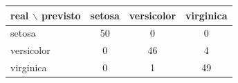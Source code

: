 
\begin{tabular}{lccc}
\toprule
\textbf{real $\backslash$ previsto} & \textbf{setosa} & \textbf{versicolor} & \textbf{virginica} \\
\midrule
setosa & 50 & 0 & 0 \\
versicolor & 0 & 46 & 4 \\
virginica & 0 & 1 & 49 \\
\bottomrule
\end{tabular}
